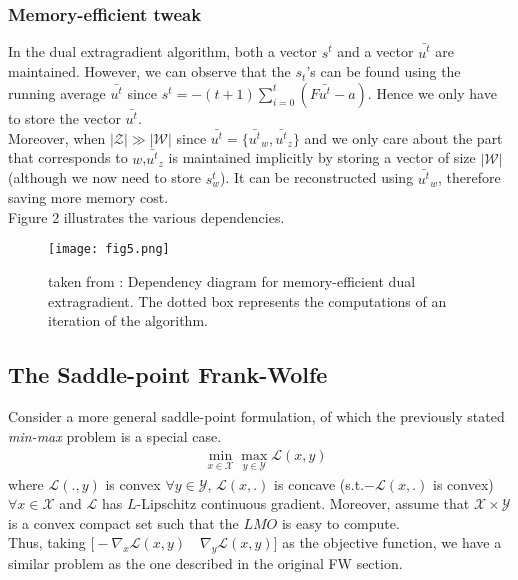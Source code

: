 \documentclass{article}
\begin{document}
\subsubsection{Memory-efficient tweak}
In the dual extragradient algorithm, both a vector $s^t$ and a vector
$\bar{u^t}$ are maintained. However, we can observe that the $s_t$'s can be
found using the running average $\bar{u^t}$ since $s^t = -(t + 1 ) \sum_{i=0}^t
(F \bar{u^t} - a)$. Hence we only have to store the vector $\bar{u^t}$.\\
Moreover, when $|\mathcal{Z}| \gg |\mathcal{W}|$ since $\bar{u^t} = \{
\bar{u^t}_w,\bar{u^t}_z \}$ and we only care about the part that corresponds to
$w$,\quad$\bar{u^t}_z$ is maintained implicitly by storing a vector of size
$|\mathcal{W}|$ (although we now need to store $s_w^t$). It can be reconstructed
using $\bar{u^t}_w$, therefore saving more memory cost.\\
Figure 2 illustrates the various dependencies.

\begin{figure}
  \texttt{[image: fig5.png]}
  \caption{taken from \cite{Taskaretal06}: Dependency diagram for memory-efficient dual extragradient. The dotted box represents the computations of an iteration of the algorithm.}
  \label{fig:Dependency diagram}
\end{figure}

\subsection{The Saddle-point Frank-Wolfe}
Consider a more general saddle-point formulation, of which the previously stated \textit{min-max} problem is a special case.
\begin{equation*}
\begin{aligned}
    &\min_{x\in\mathcal{X}}\max_{y\in\mathcal{Y}}\mathcal{L}(x,y)
\end{aligned}
\end{equation*}
where $\mathcal{L}(.,y)$ is convex $\forall y\in\mathcal{Y}$, $\mathcal{L}(x,.)$ is concave (s.t.$- \mathcal{L}(x,.)$ is convex) $\forall x\in\mathcal{X}$  and $\mathcal{L}$ has $L$-Lipschitz continuous gradient. Moreover, assume that $\mathcal{X}\times\mathcal{Y}$ is a convex compact set  such that the $LMO$ is easy to compute.\\
Thus, taking $\Big[-\nabla_{x} \mathcal{L}(x,y)\quad \nabla_{y} \mathcal{L}(x,y)\Big]$ as the objective function, we have a similar problem as the one described in the original FW section.
\end{document}
